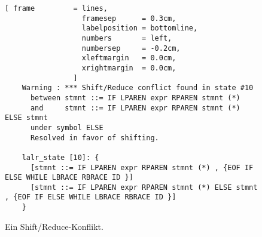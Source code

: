 \begin{figure}[!ht]
\centering
\begin{Verbatim}[ frame         = lines, 
                  framesep      = 0.3cm, 
                  labelposition = bottomline,
                  numbers       = left,
                  numbersep     = -0.2cm,
                  xleftmargin   = 0.0cm,
                  xrightmargin  = 0.0cm,
                ]
    Warning : *** Shift/Reduce conflict found in state #10
      between stmnt ::= IF LPAREN expr RPAREN stmnt (*) 
      and     stmnt ::= IF LPAREN expr RPAREN stmnt (*) ELSE stmnt 
      under symbol ELSE
      Resolved in favor of shifting.

    lalr_state [10]: {
      [stmnt ::= IF LPAREN expr RPAREN stmnt (*) , {EOF IF ELSE WHILE LBRACE RBRACE ID }]
      [stmnt ::= IF LPAREN expr RPAREN stmnt (*) ELSE stmnt , {EOF IF ELSE WHILE LBRACE RBRACE ID }]
    }
\end{Verbatim}
\vspace*{-0.3cm}
\caption{Ein Shift/Reduce-Konflikt.}
\label{fig:dangling-else.output}
\end{figure}

